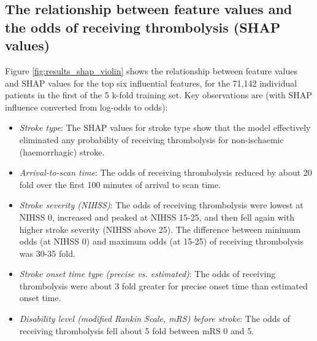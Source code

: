 
\subsection{The relationship between feature values and the odds of receiving thrombolysis (SHAP values)}

Figure \ref{fig:results_shap_violin} shows the relationship between feature values and SHAP values for the top six influential features, for the 71,142 individual patients in the first of the 5 k-fold training set. Key observations are (with SHAP influence converted from log-odds to odds):

\begin{itemize}
    \item \emph{Stroke type}: The SHAP values for stroke type show that the model effectively eliminated any probability of receiving thrombolysis for non-ischaemic (haemorrhagic) stroke.
    \item \emph{Arrival-to-scan time}: The odds of receiving thrombolysis reduced by about 20 fold over the first 100 minutes of arrival to scan time.
    \item \emph{Stroke severity (NIHSS)}: The odds of receiving thrombolysis were lowest at NIHSS 0, increased and peaked at NIHSS 15-25, and then fell again with higher stroke severity (NIHSS above 25). The difference between minimum odds (at NIHSS 0) and maximum odds (at 15-25) of receiving thrombolysis was 30-35 fold.
    \item \emph{Stroke onset time type (precise vs. estimated)}: The odds of receiving thrombolysis were about 3 fold greater for precise onset time than estimated onset time.
    \item \emph{Disability level (modified Rankin Scale, mRS) before stroke}: The odds of receiving thrombolysis fell about 5 fold between mRS 0 and 5.
\end{itemize}



